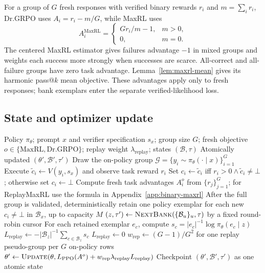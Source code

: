 \documentclass{article}
\newcommand{\1}{\mathbf 1}
\theoremstyle{remark}
\theoremstyle{definition}
\theoremstyle{plain}
\begin{document}
For a group of $G$ fresh responses with verified binary rewards $r_i$ and
$m=\sum_i r_i$, Dr.GRPO uses $A_i=r_i-m/G$, while MaxRL uses
\[
 A_i^{\mathrm{MaxRL}}=
 \begin{cases}
 G r_i/m-1, & m>0,\\
 0, & m=0.
 \end{cases}
\]
The centered MaxRL estimator \citep{tajwar2026maxrl} gives failures advantage
$-1$ in mixed groups and weights each success more strongly when successes
are scarce. All-correct and all-failure groups have zero task advantage.
Lemma~\ref{lem:maxrl-mean} gives its harmonic pass@\(k\) mean objective.
These advantages apply only to fresh responses; bank exemplars enter the
separate verified-likelihood loss.

\subsection{State and optimizer update}
\label{app:algorithm-update}

\begin{algorithm}[H]
  \caption{One ReplayMaxRL optimizer update}
  \label{alg:verified-replay-update}
  \small
  \begin{algorithmic}[1]
    \REQUIRE Policy $\pi_\theta$; prompt $x$ and verifier specification
      $s_x$; group size $G$; fresh objective $o\in\{\mathrm{MaxRL},\mathrm{Dr.GRPO}\}$; replay weight $\lambda_{\mathrm{replay}}$;
      states $(\mathcal B,\tau)$
    \ENSURE Atomically updated $(\theta',\mathcal B',\tau')$
    \STATE Draw the on-policy group
      $\mathcal G=\{y_i\sim\pi_\theta(\cdot\mid x)\}_{i=1}^G$
      \STATE Execute $\widetilde c_i\gets V(y_i,s_x)$ and observe task
        reward $r_i$
      \STATE Set $c_i\gets\widetilde c_i$ iff
        $r_i>0\wedge\widetilde c_i\ne\bot$; otherwise set $c_i\gets\bot$
    \ENDFOR
    \STATE Compute fresh task advantages $A_i^{o}$ from $\{r_j\}_{j=1}^G$; for ReplayMaxRL use the formula in Appendix~\ref{app:binary-maxrl}
    \STATE After the full group is validated, deterministically retain one
      policy exemplar for each new $c_i\ne\bot$ in $\mathcal B_x$, up to
      capacity $M$
    \STATE $(z,\tau')\gets\textsc{NextBank}
      (\{\mathcal B_u\}_u,\tau)$ by a fixed round-robin cursor
      \STATE For each retained exemplar $e_c$, compute
        $s_c=|e_c|^{-1}\log\pi_\theta(e_c\mid z)$
      \STATE $L_{\mathrm{replay}}\gets-|\mathcal B_z|^{-1}
        \sum_{c\in\mathcal B_z}s_c$
    \ELSE
      \STATE $L_{\mathrm{replay}}\gets0$
    \ENDIF
    \STATE $w_{\mathrm{rep}}\gets(G-1)/G^2$ for one replay
      pseudo-group per $G$ on-policy rows
    \STATE $\theta'\gets\textsc{Update}
      (\theta,L_{\mathrm{PPO}}(A^{o})
      +w_{\mathrm{rep}}\lambda_{\mathrm{replay}}L_{\mathrm{replay}})$
    \STATE Checkpoint $(\theta',\mathcal B',\tau')$ as one atomic state
\end{algorithmic}
\end{algorithm}
\end{document}
